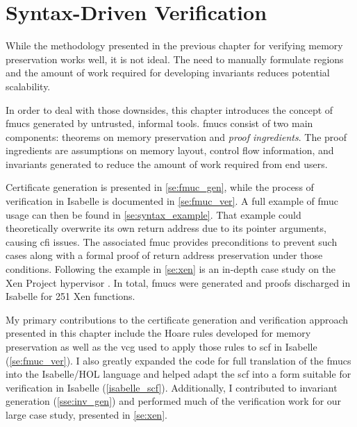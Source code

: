 \chapter{Syntax-Driven Verification}\label{ch:syntax}
While the methodology presented in the previous chapter
for verifying memory preservation works well, it is not ideal.
The need to manually formulate regions
and the amount of work required for developing invariants
reduces potential scalability.

In order to deal with those downsides,
this chapter introduces the concept of \acp{fmuc}
generated by untrusted, informal tools.
\Acp{fmuc} consist of two main components:
theorems on memory preservation and \emph{proof ingredients}.%
The proof ingredients are assumptions on memory layout,
control flow information, and invariants
generated to reduce the amount of work required from end users.

Certificate generation is presented in \cref{se:fmuc_gen},
while the process of verification in Isabelle is documented in \cref{se:fmuc_ver}.
A full example of \ac{fmuc} usage can then be found in \cref{se:syntax_example}.
That example could theoretically overwrite
its own return address due to its pointer arguments, causing \ac{cfi} issues.
The associated \ac{fmuc} provides preconditions to prevent such cases
along with a formal proof of return address preservation under those conditions.
Following the example in \cref{se:xen} is an in-depth case study
on the Xen Project hypervisor \autocite{chisnall2008definitive}.
In total, \acp{fmuc} were generated and proofs discharged in Isabelle
for 251 Xen functions.

My primary contributions to the certificate generation and verification approach%
presented in this chapter include the Hoare rules developed
for memory preservation as well as the \ac{vcg} used to apply those rules
to \ac{scf} in Isabelle (\cref{se:fmuc_ver}).
I also greatly expanded the code for full translation of the \acp{fmuc}
into the Isabelle/HOL language
and helped adapt the \ac{scf} into a form suitable for verification
in Isabelle (\cref{isabelle_scf}).
Additionally, I contributed to invariant generation (\cref{sse:inv_gen})
and performed much of the verification work for our large case study,
presented in \cref{se:xen}.


